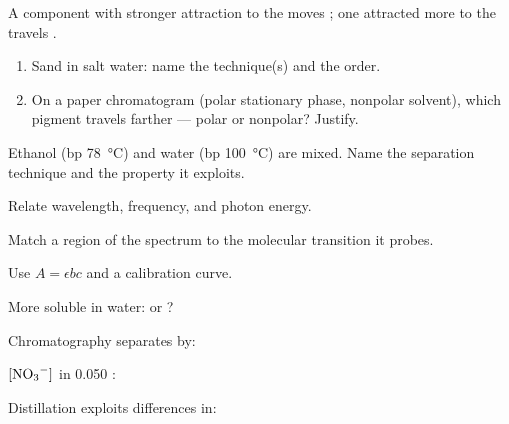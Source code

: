 \documentclass{apchem-notes}
\begin{document}

A component with stronger attraction to the  moves
; one attracted more to the 
travels .


\begin{enumerate}[leftmargin=*,itemsep=0.4em]
  \item Sand in salt water: name the technique(s) and the order.
  \item On a paper chromatogram (polar stationary phase, nonpolar solvent),
        which pigment travels farther --- polar or nonpolar? Justify.
\end{enumerate}

\begin{exitticket}
Ethanol (bp \SI{78}{\celsius}) and water (bp \SI{100}{\celsius}) are mixed.
Name the separation technique and the property it exploits.
\end{exitticket}


\begin{objectives}
  \item Relate wavelength, frequency, and photon energy.
  \item Match a region of the spectrum to the molecular transition it probes.
  \item Use $A = \epsilon bc$ and a calibration curve.
\end{objectives}

\quad{}

\begin{warmup}[4]
  \item More soluble in water:  or ?
  \item Chromatography separates by: 
  \item $[\ce{NO3-}]$ in \SI{0.050}{\Molar} :
  \item Distillation exploits differences in:
\end{warmup}
\end{document}
